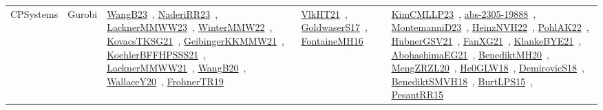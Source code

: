 {\begin{longtable}{lp{3cm}>{\raggedright\arraybackslash}p{6cm}>{\raggedright\arraybackslash}p{6cm}>{\raggedright\arraybackslash}p{8cm}}
CPSystems & Gurobi & \href{works/WangB23.pdf}{WangB23}~\cite{WangB23}, \href{works/NaderiRR23.pdf}{NaderiRR23}~\cite{NaderiRR23}, \href{works/LacknerMMWW23.pdf}{LacknerMMWW23}~\cite{LacknerMMWW23}, \href{works/WinterMMW22.pdf}{WinterMMW22}~\cite{WinterMMW22}, \href{works/KovacsTKSG21.pdf}{KovacsTKSG21}~\cite{KovacsTKSG21}, \href{works/GeibingerKKMMW21.pdf}{GeibingerKKMMW21}~\cite{GeibingerKKMMW21}, \href{works/KoehlerBFFHPSSS21.pdf}{KoehlerBFFHPSSS21}~\cite{KoehlerBFFHPSSS21}, \href{works/LacknerMMWW21.pdf}{LacknerMMWW21}~\cite{LacknerMMWW21}, \href{works/WangB20.pdf}{WangB20}~\cite{WangB20}, \href{works/WallaceY20.pdf}{WallaceY20}~\cite{WallaceY20}, \href{works/FrohnerTR19.pdf}{FrohnerTR19}~\cite{FrohnerTR19} & \href{works/VlkHT21.pdf}{VlkHT21}~\cite{VlkHT21}, \href{works/GoldwaserS17.pdf}{GoldwaserS17}~\cite{GoldwaserS17}, \href{works/FontaineMH16.pdf}{FontaineMH16}~\cite{FontaineMH16} & \href{works/KimCMLLP23.pdf}{KimCMLLP23}~\cite{KimCMLLP23}, \href{works/abs-2305-19888.pdf}{abs-2305-19888}~\cite{abs-2305-19888}, \href{works/MontemanniD23.pdf}{MontemanniD23}~\cite{MontemanniD23}, \href{works/HeinzNVH22.pdf}{HeinzNVH22}~\cite{HeinzNVH22}, \href{works/PohlAK22.pdf}{PohlAK22}~\cite{PohlAK22}, \href{works/HubnerGSV21.pdf}{HubnerGSV21}~\cite{HubnerGSV21}, \href{works/FanXG21.pdf}{FanXG21}~\cite{FanXG21}, \href{works/KlankeBYE21.pdf}{KlankeBYE21}~\cite{KlankeBYE21}, \href{works/AbohashimaEG21.pdf}{AbohashimaEG21}~\cite{AbohashimaEG21}, \href{works/BenediktMH20.pdf}{BenediktMH20}~\cite{BenediktMH20}, \href{works/MengZRZL20.pdf}{MengZRZL20}~\cite{MengZRZL20}, \href{works/He0GLW18.pdf}{He0GLW18}~\cite{He0GLW18}, \href{works/DemirovicS18.pdf}{DemirovicS18}~\cite{DemirovicS18}, \href{works/BenediktSMVH18.pdf}{BenediktSMVH18}~\cite{BenediktSMVH18}, \href{works/BurtLPS15.pdf}{BurtLPS15}~\cite{BurtLPS15}, \href{works/PesantRR15.pdf}{PesantRR15}~\cite{PesantRR15}\\

\end{longtable}}
